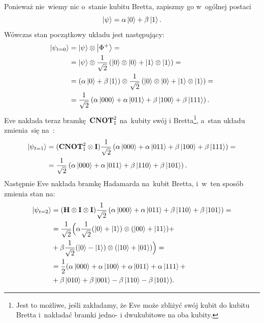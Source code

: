 Ponieważ nie~wiemy nic o~stanie kubitu Bretta, zapiszmy go w~ogólnej postaci
$$
	\ket{\psi} = \alpha \ket{0} + \beta \ket{1}.
$$
Wówczas stan początkowy układu jest następujący:
\begin{equation*}
	\begin{split}
		\ket{\psi_{t=0}} &=  \ket{\psi} \otimes \ket{\Phi^+}  =\\
		&= \ket{\psi} \otimes \frac{1}{\sqrt{2}}\left( \ket{0} \otimes \ket{0} +\ket{1} \otimes \ket{1} \right) = \\
		&= \left(\alpha \ket{0} + \beta  \ket{1}\right) \otimes \frac{1}{\sqrt{2}}\left( \ket{0} \otimes \ket{0} +\ket{1} \otimes \ket{1} \right)= \\
		&= \frac{1}{\sqrt{2}} \left(\alpha \ket{000} + \alpha \ket{011} + \beta  \ket{100} + \beta  \ket{111}  \right).
	\end{split}
\end{equation*}
Eve nakłada teraz bramkę~$\mathbf{CNOT}_1^2$ na~kubity swój i
Bretta\footnote{Jest to możliwe, jeśli zakładamy, że Eve może zbliżyć swój
	kubit do kubitu Bretta i~nakładać bramki jedno- i dwukubitowe na oba
	kubity.}, a~stan układu zmienia~się na~:
\begin{equation*}
	\begin{split}
		\ket{\psi_{t=1}} &= (\mathbf{CNOT}_1^2\otimes \mathbf{I}) \frac{1}{\sqrt{2}} \left(\alpha \ket{000} + \alpha \ket{011} + \beta \ket{100} + \beta \ket{111}  \right) =\\
		&=\frac{1}{\sqrt{2}} \left(\alpha \ket{000} + \alpha \ket{011} + \beta \ket{110} + \beta \ket{101}  \right).
	\end{split}
\end{equation*}
Następnie Eve nakłada bramkę Hadamarda na~kubit Bretta, i~w~ten sposób zmienia stan na:
\begin{equation*}
	\begin{split}
		\ket{\psi_{t=2}} &=( \mathbf{H}\otimes\mathbf{I}\otimes\mathbf{I}) \frac{1}{\sqrt{2}} \left(\alpha \ket{000} + \alpha \ket{011} + \beta \ket{110} + \beta \ket{101}  \right) =\\
		&= \frac{1}{\sqrt{2}} \Big(
		\alpha \frac{1}{\sqrt{2}}(\ket{0}+\ket{1})\otimes (\ket{00} +  \ket{11}) + \\
		& + \beta \frac{1}{\sqrt{2}}(\ket{0}-\ket{1})\otimes(\ket{10} + \ket{01}) \Big) =\\
		&= \frac{1}{2} (\alpha \ket{000} + \alpha \ket{100}  + \alpha \ket{011} + \alpha \ket{111} + \\
		&+ \beta \ket{010} + \beta \ket{001} - \beta \ket{110} - \beta \ket{101} ).
	\end{split}
\end{equation*}
